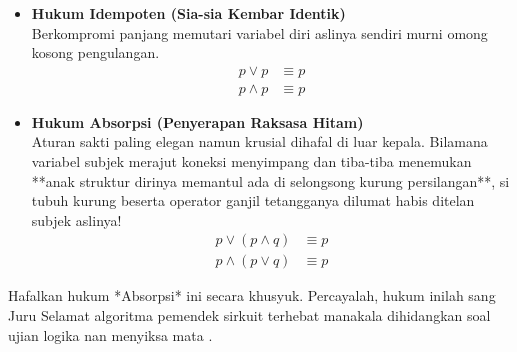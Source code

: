 \begin{itemize}
    \item \textbf{Hukum Idempoten (Sia-sia Kembar Identik)} \\
    Berkompromi panjang memutari variabel diri aslinya sendiri murni omong kosong pengulangan.
    \begin{align*}
        p \vee p &\equiv p \\
        p \wedge p &\equiv p
    \end{align*}

    \item \textbf{Hukum Absorpsi (Penyerapan Raksasa Hitam)} \\
    Aturan sakti paling elegan namun krusial dihafal di luar kepala. Bilamana variabel subjek merajut koneksi menyimpang dan tiba-tiba menemukan **anak struktur dirinya memantul ada di selongsong kurung persilangan**, si tubuh kurung beserta operator ganjil tetangganya dilumat habis ditelan subjek aslinya!
    \begin{align*}
        p \vee (p \wedge q) &\equiv p \\
        p \wedge (p \vee q) &\equiv p
    \end{align*}
\end{itemize}
Hafalkan hukum *Absorpsi* ini secara khusyuk. Percayalah, hukum inilah sang Juru Selamat algoritma pemendek sirkuit terhebat manakala dihidangkan soal ujian logika nan menyiksa mata \cite{wiki_first_order_logic}.
